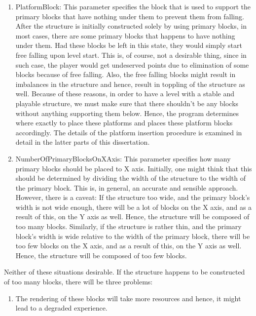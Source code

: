 \documentclass{dalthesis}
\begin{document}
\begin{enumerate}
\begin{enumerate}
    \item PlatformBlock: This parameter specifies the block that is used to support the primary blocks that have nothing under them to prevent them from falling. After the structure is initially constructed solely by using primary blocks, in most cases, there are some primary blocks that happens to have nothing under them. Had these blocks be left in this state, they would simply start free falling upon level start. This is, of course, not a desirable thing, since in such case, the player would get undeserved points due to elimination of some blocks because of free falling. Also, the free falling blocks might result in imbalances in the structure and hence, result in toppling of the structure as well. Because of these reasons, in order to have a level with a stable and playable structure, we must make sure that there shouldn't be any blocks without anything supporting them below. Hence, the program determines where exactly to place these platforms and places these platform blocks accordingly. The details of the platform insertion procedure is examined in detail in the latter parts of this dissertation.

    \item NumberOfPrimaryBlocksOnXAxis: This parameter specifies how many primary blocks should be placed to X axis. Initially, one might think that this should be determined by dividing the width of the structure to the width of the primary block. This is, in general, an accurate and sensible approach. However, there is a caveat: If the structure too wide, and the primary block's width is not wide enough, there will be a lot of blocks on the X axis, and as a result of this, on the Y axis as well. Hence, the structure will be composed of too many blocks. Similarly, if the structure is rather thin, and the primary block's width is wide relative to the width of the primary block, there will be too few blocks on the X axis, and as a result of this, on the Y axis as well. Hence, the structure will be composed of too few blocks.
  \end{enumerate}

  Neither of these situations desirable. If the structure happens to be constructed of too many blocks, there will be three problems:

  \begin{enumerate}
    \item The rendering of these blocks will take more resources and hence, it might lead to a degraded experience.


\end{enumerate}
\end{enumerate}
\end{document}
